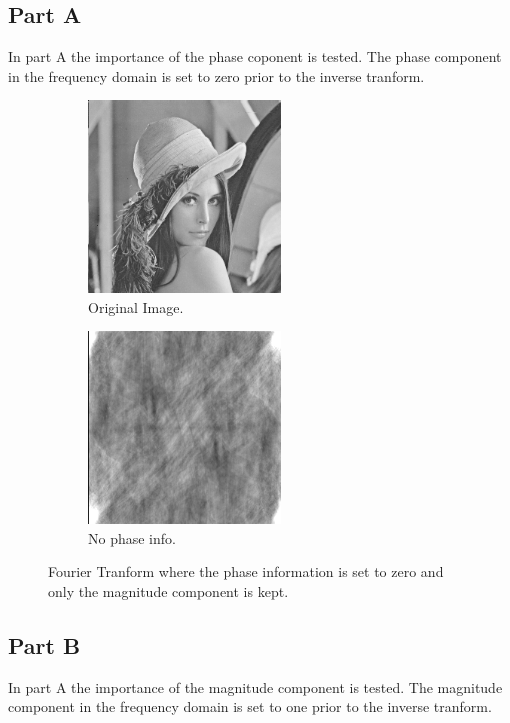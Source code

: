 \documentclass[letter]{article}
\begin{document}
\subsection{Part A}
In part A the importance of the phase coponent is tested. The phase component in the frequency domain is set to zero prior to the inverse tranform.
\begin{figure}[hbtp]
  \centering
  \begin{subfigure}{5.1cm}
    \includegraphics[width=5.1cm]{images/lenna.png}
    \caption{Original Image.}
  \end{subfigure}
  \begin{subfigure}{5.1cm}
    \includegraphics[width=5.1cm]{images/lenna_mag_only.png}
    \caption{No phase info.}
  \end{subfigure}
  \caption{Fourier Tranform where the phase information is set to zero and only the magnitude component is kept.}
  \label{fig:ft_mag}
\end{figure}
\subsection{Part B}
In part A the importance of the magnitude component is tested. The magnitude component in the frequency domain is set to one prior to the inverse tranform.
\end{document}
